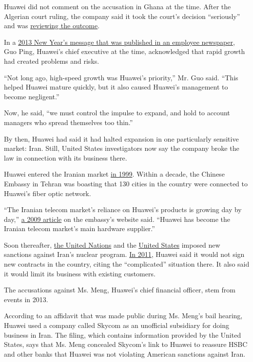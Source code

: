 Huawei did not comment on the accusation in Ghana at the time. After the
Algerian court ruling, the company said it took the court's decision
``seriously'' and was
\href{http://www.information-age.com/huawei-and-zte-execs-convicted-of-bribery-in-algeria-2107858/}{reviewing
the outcome}.

In a \href{https://forum.huawei.com/zh/portal.php?mod=view\&aid=63}{2013
New Year's message that was published in an employee newspaper}, Guo
Ping, Huawei's chief executive at the time, acknowledged that rapid
growth had created problems and risks.

``Not long ago, high-speed growth was Huawei's priority,'' Mr. Guo said.
``This helped Huawei mature quickly, but it also caused Huawei's
management to become negligent.''

Now, he said, ``we must control the impulse to expand, and hold to
account managers who spread themselves too thin.''

By then, Huawei had said it had halted expansion in one particularly
sensitive market: Iran. Still, United States investigators now say the
company broke the law in connection with its business there.

Huawei entered the Iranian market
\href{http://ir.mofcom.gov.cn/article/ztdy/200511/20051100704444.shtml}{in
1999}. Within a decade, the Chinese Embassy in Tehran was boasting that
130 cities in the country were connected to Huawei's fiber optic
network.

``The Iranian telecom market's reliance on Huawei's products is growing
day by day,''
\href{http://ir.mofcom.gov.cn/article/jmxw/200906/20090606329688.shtml}{a
2009 article} on the embassy's website said. ``Huawei has become the
Iranian telecom market's main hardware supplier.''

Soon thereafter,
\href{https://www.nytimes.com/2010/06/10/world/middleeast/10sanctions.html}{the
United Nations} and the
\href{https://www.nytimes.com/2010/07/02/world/middleeast/02sanctions.html}{United
States} imposed new sanctions against Iran's nuclear program.
\href{https://www.bbc.com/zhongwen/trad/business/2011/12/111210_huawei_iran}{In
2011}, Huawei said it would not sign new contracts in the country,
citing the ``complicated'' situation there. It also said it would limit
its business with existing customers.

The accusations against Ms. Meng, Huawei's chief financial officer, stem
from events in 2013.

According to an affidavit that was made public during Ms. Meng's bail
hearing, Huawei used a company called Skycom as an unofficial subsidiary
for doing business in Iran. The filing, which contains information
provided by the United States, says that Ms. Meng concealed Skycom's
link to Huawei to reassure HSBC and other banks that Huawei was not
violating American sanctions against Iran.


